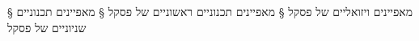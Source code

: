 
§ מאפיינים ויזואליים של פסקל
§ מאפיינים תכנוניים ראשוניים של פסקל
§ מאפיינים תכנוניים שניוניים של פסקל


